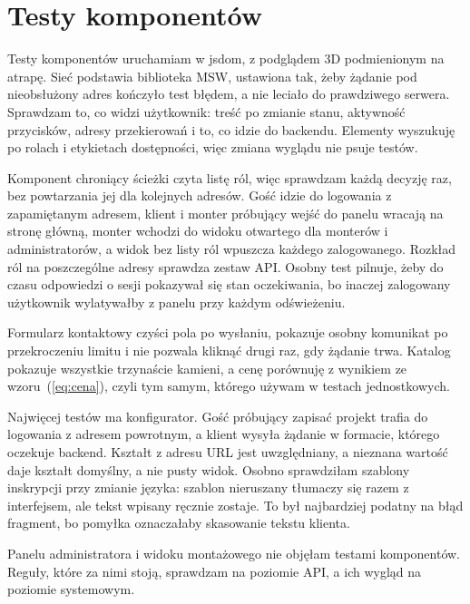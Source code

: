 \section{Testy komponentów}
\label{sec:testy-komponentow}

Testy komponentów uruchamiam w jsdom, z podglądem 3D podmienionym na atrapę. Sieć podstawia biblioteka MSW, ustawiona tak, żeby żądanie pod nieobsłużony adres kończyło test błędem, a nie leciało do prawdziwego serwera. Sprawdzam to, co widzi użytkownik: treść po zmianie stanu, aktywność przycisków, adresy przekierowań i to, co idzie do backendu. Elementy wyszukuję po rolach i etykietach dostępności, więc zmiana wyglądu nie psuje testów.

Komponent chroniący ścieżki czyta listę ról, więc sprawdzam każdą decyzję raz, bez powtarzania jej dla kolejnych adresów. Gość idzie do logowania z zapamiętanym adresem, klient i monter próbujący wejść do panelu wracają na stronę główną, monter wchodzi do widoku otwartego dla monterów i administratorów, a widok bez listy ról wpuszcza każdego zalogowanego. Rozkład ról na poszczególne adresy sprawdza zestaw API. Osobny test pilnuje, żeby do czasu odpowiedzi o sesji pokazywał się stan oczekiwania, bo inaczej zalogowany użytkownik wylatywałby z panelu przy każdym odświeżeniu.

Formularz kontaktowy czyści pola po wysłaniu, pokazuje osobny komunikat po przekroczeniu limitu i nie pozwala kliknąć drugi raz, gdy żądanie trwa. Katalog pokazuje wszystkie trzynaście kamieni, a cenę porównuję z wynikiem ze wzoru~(\ref{eq:cena}), czyli tym samym, którego używam w testach jednostkowych.

Najwięcej testów ma konfigurator. Gość próbujący zapisać projekt trafia do logowania z adresem powrotnym, a klient wysyła żądanie w formacie, którego oczekuje backend. Kształt z adresu URL jest uwzględniany, a nieznana wartość daje kształt domyślny, a nie pusty widok. Osobno sprawdziłam szablony inskrypcji przy zmianie języka: szablon nieruszany tłumaczy się razem z interfejsem, ale tekst wpisany ręcznie zostaje. To był najbardziej podatny na błąd fragment, bo pomyłka oznaczałaby skasowanie tekstu klienta.

Panelu administratora i widoku montażowego nie objęłam testami komponentów. Reguły, które za nimi stoją, sprawdzam na poziomie API, a ich wygląd na poziomie systemowym.

